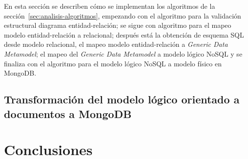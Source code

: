 En esta sección se describen cómo se implementan los algoritmos de la sección~\ref{sec:analisis-algoritmos}, empezando con el algoritmo para la validación estructural diagrama entidad-relación; se sigue con algoritmo para el mapeo modelo entidad-relación a relacional; después está la obtención de esquema SQL desde modelo relacional, el mapeo modelo entidad-relación a \textit{Generic Data Metamodel}; el mapeo del \textit{Generic Data Metamodel} a modelo lógico NoSQL y se finaliza con el algoritmo para el modelo lógico NoSQL a modelo físico en MongoDB.




\subsection{Transformación del modelo lógico orientado a documentos a MongoDB}







\section{Conclusiones}
